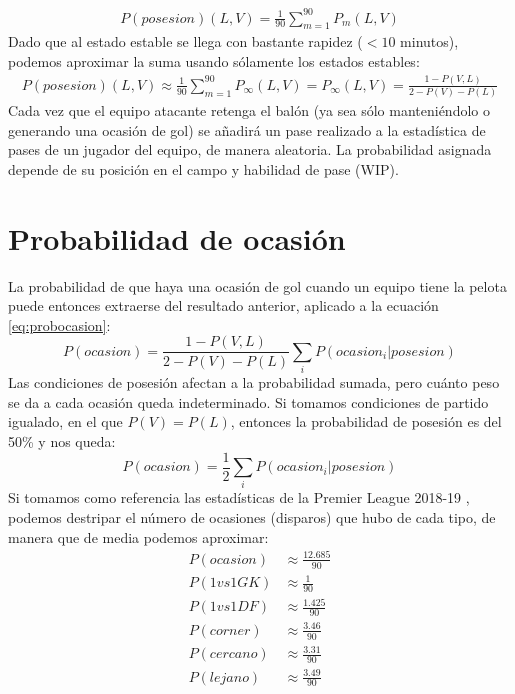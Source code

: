\documentclass[a4paper,9pt]{article}
\begin{document}
\begin{align}
	P(posesion)(L,V)=\frac{1}{90}\sum_{m=1}^{90}P_m(L,V)
\end{align}
Dado que al estado estable se llega con bastante rapidez ($<10$ minutos), podemos aproximar la suma usando sólamente los estados estables:
\begin{align}
	P(posesion)(L,V)\approx\frac{1}{90}\sum_{m=1}^{90}P_\infty(L,V)=P_\infty(L,V)=\frac{1-P(V,L)}{2-P(V)-P(L)}
\end{align}
Cada vez que el equipo atacante retenga el balón (ya sea sólo manteniéndolo o generando una ocasión de gol) se añadirá un pase realizado a la estadística de pases de un jugador del equipo, de manera aleatoria. La probabilidad asignada depende de su posición en el campo y habilidad de pase (WIP).


\section{Probabilidad de ocasión}\label{sec:ProbOcasion}
\def \Pocasion {\ensuremath{\frac{12.685}{90}}}
\def \PvsGK {\ensuremath{\frac{1}{90}}}
\def \PvsDF {\ensuremath{\frac{1.425}{90}}}
\def \Pcorner {\ensuremath{\frac{3.46}{90}}}
\def \Pclose {\ensuremath{\frac{3.31}{90}}}
\def \Pfar {\ensuremath{\frac{3.49}{90}}}
La probabilidad de que haya una ocasión de gol cuando un equipo tiene la pelota puede entonces extraerse del resultado anterior, aplicado a la ecuación \ref{eq:probocasion}:
\begin{equation}\label{eq:probocasion2}
	P(ocasion)=\frac{1-P(V,L)}{2-P(V)-P(L)}\sum_i{P(ocasion_i|posesion)}
\end{equation}
Las condiciones de posesión afectan a la probabilidad sumada, pero cuánto peso se da a cada ocasión queda indeterminado. Si tomamos condiciones de partido igualado, en el que $P(V)=P(L)$, entonces la probabilidad de posesión es del 50\% y nos queda:
\begin{equation}
	P(ocasion)=\frac{1}{2}\sum_i{P(ocasion_i|posesion)}
\end{equation}
Si tomamos como referencia las estadísticas de la Premier League 2018-19 \cite{PremierLeague}, podemos destripar el número de ocasiones (disparos) que hubo de cada tipo, de manera que de media podemos aproximar:
\begin{align}
	P(ocasion)&\approx\Pocasion\\
	P(1vs1GK)&\approx\PvsGK\\
	P(1vs1DF)&\approx\PvsDF\\
	P(corner)&\approx\Pcorner\\
	P(cercano)&\approx\Pclose\\
	P(lejano)&\approx\Pfar
\end{align}
\end{document}
